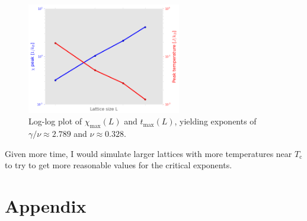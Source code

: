 \documentclass[11pt, oneside]{article}
\begin{document}
\begin{figure}[H]
   \centering
   \includegraphics[width=0.6\textwidth]{img/5D/gam_nu} %
   \caption{Log-log plot of $\chi_\text{max}(L)$ and $t_\text{max}(L)$, yielding exponents of $\gamma/\nu\approx2.789$ and $\nu\approx0.328$.}
   \label{fig:5D_gam_nu}
\end{figure}
Given more time, I would simulate larger lattices with more temperatures near $T_\text{c}$ to try to get more reasonable values for the critical exponents.
%
%
\appendix
\section{Appendix}

\end{document}
